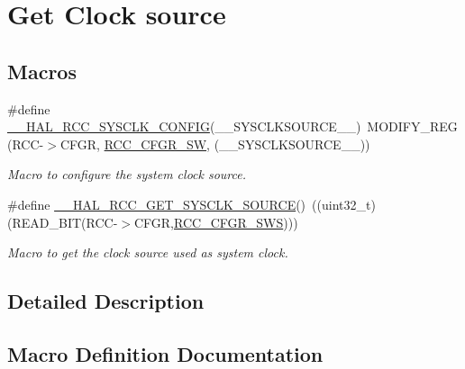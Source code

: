 \hypertarget{group___r_c_c___get___clock__source}{}\section{Get Clock source}
\label{group___r_c_c___get___clock__source}
\subsection*{Macros}
\begin{DoxyCompactItemize}
\item 
\#define \hyperlink{group___r_c_c___get___clock__source_gaa29be28740b3d480e83efbc2e695c1b8}{\+\_\+\+\_\+\+H\+A\+L\+\_\+\+R\+C\+C\+\_\+\+S\+Y\+S\+C\+L\+K\+\_\+\+C\+O\+N\+F\+IG}(\+\_\+\+\_\+\+S\+Y\+S\+C\+L\+K\+S\+O\+U\+R\+C\+E\+\_\+\+\_\+)~M\+O\+D\+I\+F\+Y\+\_\+\+R\+EG(R\+CC-\/$>$C\+F\+GR, \hyperlink{group___peripheral___registers___bits___definition_ga0eea5e5f7743a7e8995b8beeb18355c1}{R\+C\+C\+\_\+\+C\+F\+G\+R\+\_\+\+SW}, (\+\_\+\+\_\+\+S\+Y\+S\+C\+L\+K\+S\+O\+U\+R\+C\+E\+\_\+\+\_\+))
\begin{DoxyCompactList}\small\item\em Macro to configure the system clock source. \end{DoxyCompactList}\item 
\#define \hyperlink{group___r_c_c___get___clock__source_gac99c2453d9e77c8b457acc0210e754c2}{\+\_\+\+\_\+\+H\+A\+L\+\_\+\+R\+C\+C\+\_\+\+G\+E\+T\+\_\+\+S\+Y\+S\+C\+L\+K\+\_\+\+S\+O\+U\+R\+CE}()~((uint32\+\_\+t)(R\+E\+A\+D\+\_\+\+B\+IT(R\+CC-\/$>$C\+F\+GR,\hyperlink{group___peripheral___registers___bits___definition_ga15bf2269500dc97e137315f44aa015c9}{R\+C\+C\+\_\+\+C\+F\+G\+R\+\_\+\+S\+WS})))
\begin{DoxyCompactList}\small\item\em Macro to get the clock source used as system clock. \end{DoxyCompactList}\end{DoxyCompactItemize}


\subsection{Detailed Description}


\subsection{Macro Definition Documentation}
\mbox{\label{group___r_c_c___get___clock__source_gac99c2453d9e77c8b457acc0210e754c2}} 
